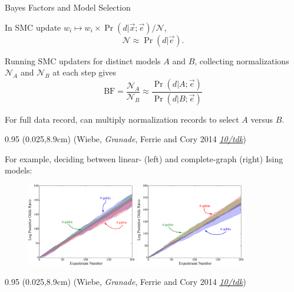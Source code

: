 \documentclass[xcolor=dvipsnames, compress]{beamer}
\renewcommand\UrlFont{\color{red}\rmfamily\itshape}
\newcommand{\shortdoi}[1]{\href{http://doi.org/#1}{\UrlFont 10/#1}}
\newcommand{\bottomnote}[1]{
  \begin{textblock*}{0.95\paperwidth} (0.025\paperwidth,8.9cm)
    {\tiny \hfill #1}
  \end{textblock*}
}
\begin{document}
\begin{frame}{Bayes Factors and Model Selection}

  In SMC update $w_i \mapsto w_i \times \Pr(d | \vec{x}; \vec{e}) / \mathcal{N}$,
  $$
    \mathcal{N} \approx \Pr(d | \vec{e}).
  $$

  Running SMC updaters for distinct models $A$ and $B$, collecting normalizations
  $\mathcal{N}_A$ and $\mathcal{N}_B$ at each step gives
  $$
    \text{BF} = \frac{\mathcal{N}_A}{\mathcal{N}_B} \approx \frac{\Pr(d | A; \vec{e})}{\Pr(d | B; \vec{e})}
  $$

  For full data record, can multiply normalization records to select $A$ versus $B$.

  \bottomnote{(Wiebe, \emph{Granade}, Ferrie and Cory 2014 \shortdoi{tdk})}

\end{frame}

\begin{frame}

  For example, deciding between linear- (left) and complete-graph (right) Ising models:

  \begin{figure}
    \centering
    \includegraphics[width=0.425\textwidth]{modelselect_linetrue}
    \includegraphics[width=0.425\textwidth]{modelselect_completetrue}
  \end{figure}

  \bottomnote{(Wiebe, \emph{Granade}, Ferrie and Cory 2014 \shortdoi{tdk})}

\end{frame}

\subsection{}
\end{document}
